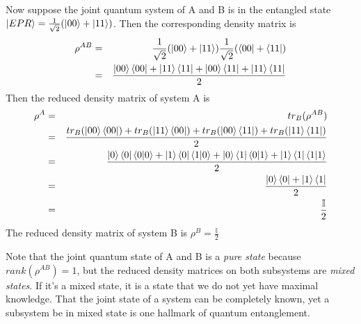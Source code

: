 \begin{example}
Now suppose the joint quantum system of A and B is in the entangled state $\ket{EPR}=\frac{1}{\sqrt{2}}(\ket{00}+\ket{11})$. Then the corresponding density matrix is
\begin{eqnarray}
\rho^{AB}&=&\frac{1}{\sqrt{2}}(\ket{00}+\ket{11})\frac{1}{\sqrt{2}}(\bra{00}+\bra{11})\\
&=& \frac{\ket{00}\bra{00}+\ket{11}\bra{11}+\ket{00}\bra{11}+\ket{11}\bra{11}}{2}
\end{eqnarray}
Then the reduced density matrix of system A is 
\begin{eqnarray}
\rho^A&=&tr_B(\rho^{AB})\\
&=&\frac{tr_B(\ket{00}\bra{00})+tr_B(\ket{11}\bra{00})+tr_B(\ket{00}\bra{11})+tr_B(\ket{11}\bra{11})}{2}\\
&=&\frac{\ket{0}\bra{0}\braket{0|0}+\ket{1}\bra{0}\braket{1|0}+\ket{0}\bra{1}\braket{0|1}+\ket{1}\bra{1}\braket{1|1}}{2}\\
&=&\frac{\ket{0}\bra{0}+\ket{1}\bra{1}}{2}\\
&=&\frac{\mathbb{I}}{2}
\end{eqnarray}
The reduced density matrix of system B is $\rho^B=\frac{\mathbb{I}}{2}$
\end{example}
Note that the joint quantum state of A and B is a \emph{pure state} because $rank(\rho^{AB})=1$, but the reduced density matrices on both subsystems are \emph{mixed states}. If it's a mixed state, it is a state that we do not yet have maximal knowledge. That the joint state of a system can be completely known, yet a subsystem be in mixed state is one hallmark of quantum entanglement.
